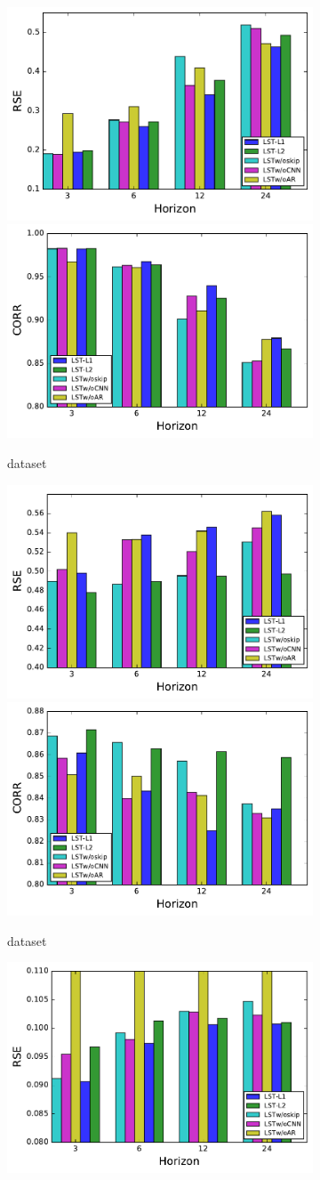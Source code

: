 \begin{figure}[!ht]

\begin{subfigure}{\textwidth}
  \centering
  \includegraphics[width=.4\linewidth]{fig/rmse-solar.pdf}
  \includegraphics[width=.4\linewidth]{fig/corr-solar.pdf}
  \vspace{-0.3 cm}
  \caption{\solar dataset}
\end{subfigure}
\begin{subfigure}{\textwidth}
  \centering
  \includegraphics[width=.4\linewidth]{fig/rmse-traffic.pdf}
  \includegraphics[width=.4\linewidth]{fig/corr-traffic.pdf}
  \vspace{-0.3 cm}
  \caption{\traffic dataset}
\end{subfigure}
\begin{subfigure}{\textwidth}
  \centering
  \includegraphics[width=.4\linewidth]{fig/rmse-ele.pdf}

\end{subfigure}
\end{figure}
